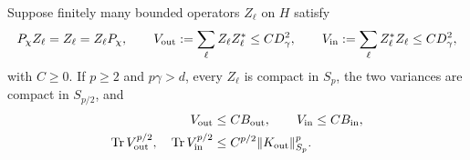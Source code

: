 \begin{proposition}\label{P:localized-finite-variance}
  Suppose finitely many bounded operators $Z_\ell$ on $H$ satisfy
  \begin{equation}\label{E:localized-finite-hypotheses}
    P_\chi Z_\ell=Z_\ell=Z_\ell P_\chi,\qquad
    V_{\rm out}:=\sum_\ell Z_\ell Z_\ell^*\le CD_\gamma^2,\qquad
    V_{\rm in}:=\sum_\ell Z_\ell^*Z_\ell\le CD_\gamma^2,
  \end{equation}
  with $C \ge 0$. If $p \ge 2$ and $p\gamma > d$, every $Z_\ell$ is compact in
  $S_p$, the two variances are compact in $S_{p/2}$, and
  \begin{align}
    V_{\rm out}&\le CB_{\rm out},\qquad V_{\rm in}\le CB_{\rm in},
    \label{E:localized-two-envelopes}\\
    \operatorname{Tr}V_{\rm out}^{p/2},\quad
    \operatorname{Tr}V_{\rm in}^{p/2}
    &\le C^{p/2}\|K_{\rm out}\|_{S_p}^p.
    \label{E:localized-trace-bounds}
  \end{align}
\end{proposition}

